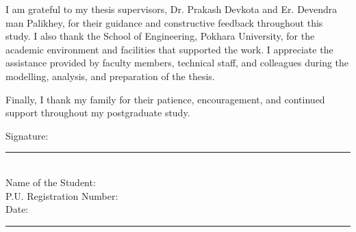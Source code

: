 \justifying
\noindent I am grateful to my thesis supervisors, Dr. Prakash Devkota and Er. Devendra man Palikhey, for their guidance and constructive feedback throughout this study. I also thank the School of Engineering, Pokhara University, for the academic environment and facilities that supported the work. I appreciate the assistance provided by faculty members, technical staff, and colleagues during the modelling, analysis, and preparation of the thesis.

Finally, I thank my family for their patience, encouragement, and continued support throughout my postgraduate study.

\vspace{3\baselineskip}
\noindent Signature: \rule{5cm}{0.4pt}\\[0.8\baselineskip]
Name of the Student: \PUStudentName\\[0.8\baselineskip]
P.U. Registration Number: \PURegistrationNumber\\[0.8\baselineskip]
Date: \rule{4cm}{0.4pt}
